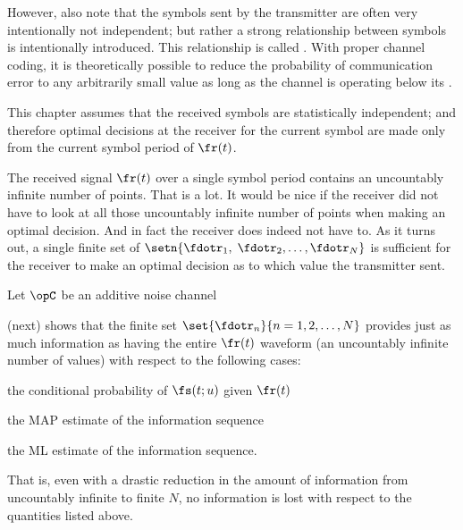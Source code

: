 However, also note that the symbols sent by the transmitter
are often very intentionally not independent;
but rather a strong relationship between symbols is intentionally
introduced. This relationship is called .
With proper channel coding, it is theoretically possible
to reduce the probability of communication error to any
arbitrarily small value as long as the channel is operating below its
.

This chapter assumes that the received symbols are
statistically independent;
and therefore optimal decisions at the receiver
for the current symbol are made
only from the current symbol period of $\fr(t)$.

The received signal $\fr(t)$ over a single symbol period
contains an uncountably infinite number of points.
That is a lot.
It would be nice if the receiver did not have to look
at all those uncountably infinite number of points
when making an optimal decision.
And in fact the receiver does indeed not have to.
As it turns out, a single finite set of 
$\setn{\fdotr_1,\;\fdotr_2,\ldots,\fdotr_N}$
is sufficient for the receiver to make an optimal decision as to
which value the transmitter sent.

\begin{definition}
\label{def:chan_stats}
Let $\opC$ be an additive noise channel
\end{definition}



 (next) shows that the finite set
$\set{\fdotr_n}{n=1,2,\ldots,N}$ provides just as
much information as having the entire $\fr(t)$ waveform
(an uncountably infinite number of values)
with respect to the following cases:
\begin{enume}
   \item the conditional probability of $\fs(t;u)$ given $\fr(t)$
   \item the MAP estimate of the information sequence
   \item the ML estimate of the information sequence.
\end{enume}
That is, even with a drastic reduction in the amount of information
from uncountably infinite to finite $N$,
no information is lost with respect to the quantities listed above.

